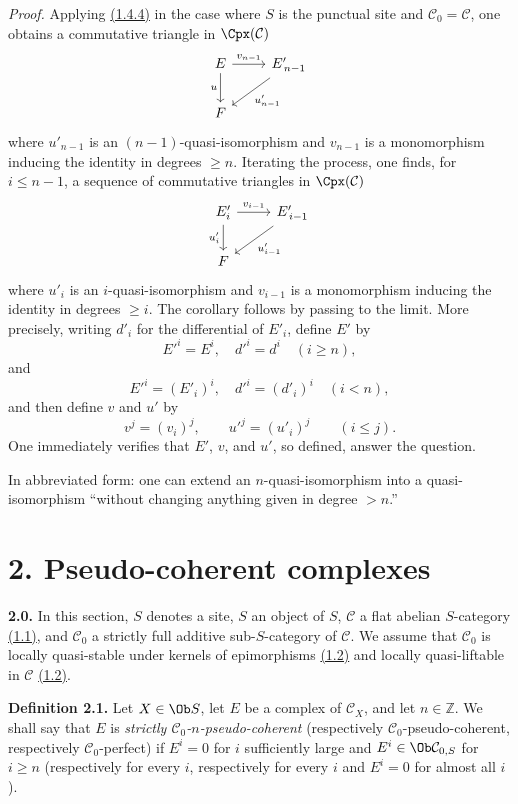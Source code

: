 \emph{Proof.} Applying \hyperlink{sga6.e01.cor.1-4-4}{(1.4.4)} in the case where \(S\) is the punctual site and \(\mathcal C_0=\mathcal C\), one obtains a commutative triangle in \(\Cpx(\mathcal C)\)
\[
\begin{tikzcd}
E \arrow[r,"v_{n-1}"] \arrow[d,"u"'] & E'_{\,n-1} \arrow[dl,"u'_{n-1}"]\\
F &
\end{tikzcd}
\]
where \(u'_{n-1}\) is an \((n-1)\)-quasi-isomorphism and \(v_{n-1}\) is a monomorphism inducing the identity in degrees \(\geq n\). Iterating the process, one finds, for \(i\leq n-1\), a sequence of commutative triangles in \(\Cpx(\mathcal C)\)
\[
\begin{tikzcd}
E'_i \arrow[r,"v_{i-1}"] \arrow[d,"u'_i"'] & E'_{\,i-1} \arrow[dl,"u'_{i-1}"]\\
F &
\end{tikzcd}
\]
where \(u'_i\) is an \(i\)-quasi-isomorphism and \(v_{i-1}\) is a monomorphism inducing the identity in degrees \(\geq i\). The corollary follows by passing to the limit. More precisely, writing \(d'_i\) for the differential of \(E'_i\), define \(E'\) by
\[
  E'^i=E^i,\quad d'^i=d^i\quad (i\geq n),
\]
and
\[
  E'^i=(E'_i)^i,\quad d'^i=(d'_i)^i\quad (i<n),
\]
and then define \(v\) and \(u'\) by
\[
  v^j=(v_i)^j,\qquad u'^j=(u'_i)^j\qquad (i\leq j).
\]
One immediately verifies that \(E'\), \(v\), and \(u'\), so defined, answer the question.

In abbreviated form: one can extend an \(n\)-quasi-isomorphism into a quasi-isomorphism ``without changing anything given in degree \(>n\).''

\section*{2. Pseudo-coherent complexes}

\textbf{2.0.} In this section, \(S\) denotes a site, \(S\) an object of \(S\), \(\mathcal C\) a flat abelian \(S\)-category \hyperlink{sga6.e01.sec.1.1}{(1.1)}, and \(\mathcal C_0\) a strictly full additive sub-\(S\)-category of \(\mathcal C\). We assume that \(\mathcal C_0\) is locally quasi-stable under kernels of epimorphisms \hyperlink{sga6.e01.sec.1.2}{(1.2)} and locally quasi-liftable in \(\mathcal C\) \hyperlink{sga6.e01.sec.1.2}{(1.2)}.

\textbf{Definition 2.1.} Let \(X\in\Ob S\), let \(E\) be a complex of \(\mathcal C_X\), and let \(n\in\mathbb Z\). We shall say that \(E\) is \emph{strictly \(\mathcal C_0\)-\(n\)-pseudo-coherent} (respectively \(\mathcal C_0\)-pseudo-coherent, respectively \(\mathcal C_0\)-perfect) if \(E^i=0\) for \(i\) sufficiently large and \(E^i\in\Ob\mathcal C_{0,S}\) for \(i\geq n\) (respectively for every \(i\), respectively for every \(i\) and \(E^i=0\) for almost all \(i\)).

